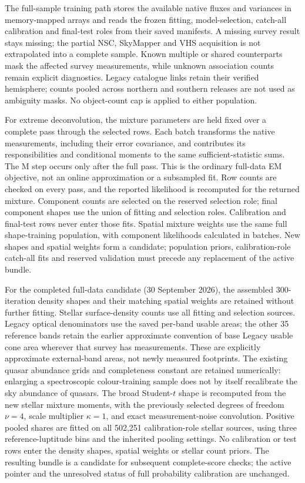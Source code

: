 \documentclass[11pt,a4paper]{article}
\begin{document}
The full-sample training path stores the available native fluxes and variances
in memory-mapped arrays and reads the frozen fitting, model-selection,
catch-all calibration and final-test roles from their saved manifests. A missing
survey result stays missing; the partial NSC, SkyMapper and VHS acquisition is
not extrapolated into a complete sample. Known multiple or shared counterparts
mask the affected survey measurements, while unknown association counts remain
explicit diagnostics. Legacy catalogue links retain their verified hemisphere;
counts pooled across northern and southern releases are not used as ambiguity
masks. No object-count cap is applied to either population.

For extreme deconvolution, the mixture parameters are held fixed over a complete
pass through the selected rows. Each batch transforms the native measurements,
including their error covariance, and contributes its responsibilities and
conditional moments to the same sufficient-statistic sums. The M step occurs
only after the full pass. This is the ordinary full-data EM objective, not an
online approximation or a subsampled fit. Row counts are checked on every pass,
and the reported likelihood is recomputed for the returned mixture. Component
counts are selected on the reserved selection role; final component shapes use
the union of fitting and selection roles. Calibration and final-test rows never
enter those fits. Spatial mixture weights use the same full shape-training
population, with component likelihoods calculated in batches. New shapes and
spatial weights form a candidate; population priors, calibration-role catch-all
fits and reserved validation must precede any replacement of the active bundle.

For the completed full-data candidate (30 September 2026), the assembled
300-iteration density shapes and their matching spatial weights are retained
without further fitting. Stellar surface-density counts use all fitting and
selection sources. Legacy optical denominators use the saved per-band usable
areas; the other 35 reference bands retain the earlier approximate convention
of base Legacy usable cone area wherever that survey has measurements. These
are explicitly approximate external-band areas, not newly measured footprints.
The existing quasar abundance grids and completeness constant are retained
numerically: enlarging a spectroscopic colour-training sample does not by
itself recalibrate the sky abundance of quasars. The broad Student-$t$ shape
is recomputed from the new stellar mixture moments, with the previously
selected degrees of freedom $\nu=4$, scale multiplier $\kappa=1$, and exact
measurement-noise convolution. Positive pooled shares are fitted on all
502,251 calibration-role stellar sources, using three reference-luptitude
bins and the inherited pooling settings. No calibration or test rows enter
the density shapes, spatial weights or stellar count priors. The resulting
bundle is a candidate for subsequent complete-score checks; the active pointer
and the unresolved status of full probability calibration are unchanged.
\end{document}
